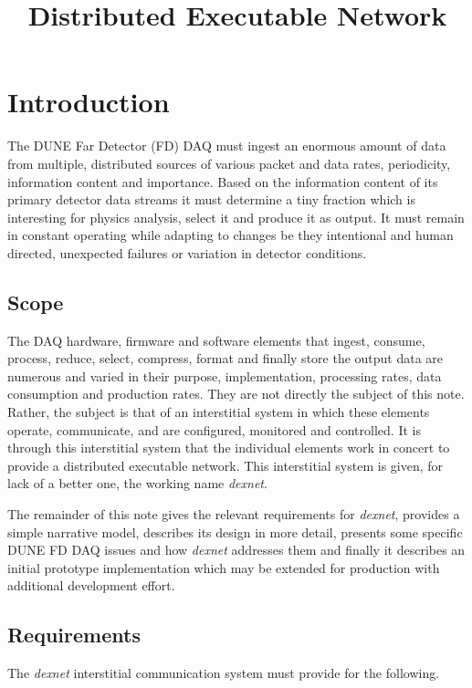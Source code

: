 \documentclass[letterpaper,oneside]{memoir}
\title{Distributed Executable Network}
\def\dexnet{\textit{dexnet}\xspace}
\begin{document}
\chapter{Introduction}
\label{ch:intro}

The DUNE Far Detector (FD) DAQ must ingest an enormous amount of data from multiple, distributed sources of various packet and data rates, periodicity, information content and importance. 
Based on the information content of its primary detector data streams it must determine a tiny fraction which is interesting for physics analysis, select it and produce it as output. 
It must remain in constant operating while adapting to changes be they intentional and human directed, unexpected failures or variation in detector conditions.

\section{Scope}
\label{sec:scope}

The DAQ hardware, firmware and software elements that ingest, consume, process, reduce, select, compress, format and finally store the output data are numerous and varied in their purpose, implementation, processing rates, data consumption and production rates. 
They are not directly the subject of this note. 
Rather, the subject is that of an interstitial system in which these elements operate, communicate, and are configured, monitored and controlled. 
It is through this interstitial system that the individual elements work in concert to provide a distributed executable network. 
This interstitial system is given, for lack of a better one, the working name \dexnet.

The remainder of this note gives the relevant requirements for \dexnet, provides a simple narrative model, describes its design in more detail, presents some specific DUNE FD DAQ issues and how \dexnet addresses them and finally it describes an initial prototype implementation which may be extended for production with additional development effort.

\section{Requirements}
\label{sec:req}

The \dexnet interstitial communication system must provide for the following.
\end{document}
